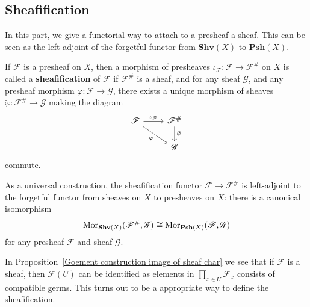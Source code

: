 \subsection{Sheafification}
In this part, we give a functorial way to attach to a presheaf a sheaf. This can be seen as the left adjoint of the forgetful functor from $\mathbf{Shv}(X)$ to $\mathbf{Psh}(X)$.
\begin{definition}
If $\mathscr{F}$ is a presheaf on $X$, then a morphism of presheaves $\iota_{\mathscr{F}}:\mathscr{F}\to\mathscr{F}^{\#}$ on $X$ is called a \textbf{sheafification} of $\mathscr{F}$ if $\mathscr{F}^{\#}$ is a sheaf, and for any sheaf $\mathscr{G}$, and any presheaf morphism $\varphi:\mathscr{F}\to\mathscr{G}$, there exists a unique morphism of sheaves $\tilde{\varphi}:\mathscr{F}^{\#}\to\mathscr{G}$ making the diagram
\[\begin{tikzcd}
\mathscr{F}\ar[rd,swap,"\varphi"]\ar[r,"\iota_{\mathscr{F}}"]&\mathscr{F}^{\#}\ar[d,"\tilde{\varphi}"]\\
&\mathscr{G}
\end{tikzcd}\]
commute.\par
As a universal construction, the sheafification functor $\mathscr{F}\to\mathscr{F}^{\#}$ is left-adjoint to the forgetful functor from sheaves on $X$ to presheaves on $X$: there is a canonical isomorphism
\[\mathrm{Mor}_{\mathbf{Shv}(X)}(\mathscr{F}^{\#},\mathscr{G})\cong\mathrm{Mor}_{\mathbf{Psh}(X)}(\mathscr{F},\mathscr{G})\]
for any presheaf $\mathscr{F}$ and sheaf $\mathscr{G}$.
\end{definition}
In Proposition~\ref{Goement construction image of sheaf char} we see that if $\mathscr{F}$ is a sheaf, then $\mathscr{F}(U)$ can be identified as elements in $\prod_{x\in U}\mathscr{F}_x$ consists of compatible germs. This turns out to be a appropriate way to define the sheafification.
